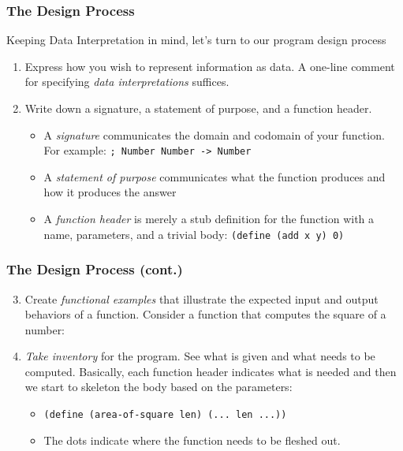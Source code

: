 \documentclass{beamer}
\begin{document}
\begin{frame}
  \frametitle{The Design Process}
  Keeping Data Interpretation in mind, let's turn to our program design process
  \begin{enumerate}
  \item<2-> Express how you wish to represent information as data. A one-line comment for specifying \emph{data interpretations} suffices.
  \item<3-> Write down a signature, a statement of purpose, and a function header.
    \begin{itemize}
    \item<4-> A \emph{signature} communicates the domain and codomain of your function. For example: \texttt{; Number Number -> Number}
    \item<5-> A \emph{statement of purpose} communicates what the function produces and how it produces the answer
    \item<6-> A \emph{function header} is merely a stub definition for the function with a name, parameters, and a trivial body: \texttt{(define (add x y) 0)}
    \end{itemize}    
  \end{enumerate}
\end{frame}



\begin{frame}
  \frametitle{The Design Process (cont.)}
  \begin{enumerate}
    \setcounter{enumi}{2}
  \item Create \emph{functional examples} that illustrate the expected input and output behaviors of a function. Consider a function that computes the square of a number: \squareExample
  \item<2-> \emph{Take inventory} for the program. See what is given and what needs to be computed. Basically, each function header indicates
    what is needed and then we start to skeleton the body based on the parameters:
    \begin{itemize}
    \item<3-> \texttt{(define (area-of-square len) (... len ...))}
    \item<4-> The dots indicate where the function needs to be fleshed out.    
    \end{itemize}
  \end{enumerate}
\end{frame}
\end{document}
